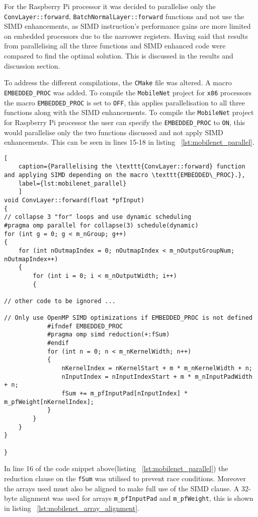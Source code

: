 For the Raspberry Pi processor it was decided to parallelise only the \texttt{ConvLayer::forward}, \texttt{BatchNormalLayer::forward} functions and not use the SIMD enhancements, as SIMD instruction's performance gains are more limited on embedded processors due to the narrower registers\cite{embedded_processors_reduced_simd_performance}. Having said that results from parallelising all the three functions and SIMD enhanced code were compared to find the optimal solution. This is discussed in the results and discussion section. 

To address the different compilations, the \texttt{CMake} file was altered. A macro \texttt{EMBEDDED\_PROC} was added. To compile the \texttt{MobileNet} project for \texttt{x86} processors the macro \texttt{EMBEDDED\_PROC} is set to \texttt{OFF}, this applies parallelisation to all three functions along with the SIMD enhancements. To compile the \texttt{MobileNet} project for Raspberry Pi processor the user can specify the \texttt{EMBEDDED\_PROC} to \texttt{ON}, this would parallelise only the two functions discussed and not apply SIMD enhancements. This can be seen in lines 15-18 in listing ~\ref{lst:mobilenet_parallel}.

\begin{lstlisting}[
	caption={Parallelising the \texttt{ConvLayer::forward} function and applying SIMD depending on the macro \texttt{EMBEDDED\_PROC}.},
	label={lst:mobilenet_parallel}
	]
void ConvLayer::forward(float *pfInput)
{
// collapse 3 "for" loops and use dynamic scheduling 
#pragma omp parallel for collapse(3) schedule(dynamic)
for (int g = 0; g < m_nGroup; g++)
{
	for (int nOutmapIndex = 0; nOutmapIndex < m_nOutputGroupNum; nOutmapIndex++)
	{
		for (int i = 0; i < m_nOutputWidth; i++)
		{
			
// other code to be ignored ... 
			
// Only use OpenMP SIMD optimizations if EMBEDDED_PROC is not defined 
			#ifndef EMBEDDED_PROC
			#pragma omp simd reduction(+:fSum)
			#endif
			for (int n = 0; n < m_nKernelWidth; n++)
			{
				nKernelIndex = nKernelStart + m * m_nKernelWidth + n;
				nInputIndex = nInputIndexStart + m * m_nInputPadWidth + n;
				fSum += m_pfInputPad[nInputIndex] * m_pfWeight[nKernelIndex];
			}
		}
	}              
}

}
\end{lstlisting}

In line 16 of the code snippet above(listing ~\ref{lst:mobilenet_parallel}) the reduction clause on the \texttt{fSum} was utilised to prevent race conditions. Moreover the arrays used must also be aligned to make full use of the SIMD clause. A 32-byte alignment was used for arrays \texttt{m\_pfInputPad} and  \texttt{m\_pfWeight}, this is shown in listing  ~\ref{lst:mobilenet_array_alignment}.


